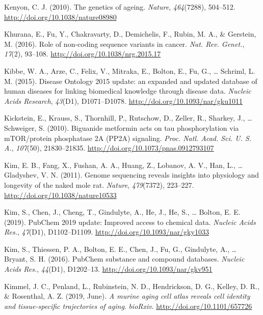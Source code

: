 \documentclass[12pt,twoside]{unicam}
\begin{document}
\begin{cslreferences}
\leavevmode\hypertarget{ref-Kenyon2010}{}%
Kenyon, C. J. (2010). The genetics of ageing. \emph{Nature}, \emph{464}(7288), 504--512. \url{http://doi.org/10.1038/nature08980}

\leavevmode\hypertarget{ref-Khurana2016}{}%
Khurana, E., Fu, Y., Chakravarty, D., Demichelis, F., Rubin, M. A., \& Gerstein, M. (2016). Role of non-coding sequence variants in cancer. \emph{Nat. Rev. Genet.}, \emph{17}(2), 93--108. \url{http://doi.org/10.1038/nrg.2015.17}

\leavevmode\hypertarget{ref-Kibbe2015}{}%
Kibbe, W. A., Arze, C., Felix, V., Mitraka, E., Bolton, E., Fu, G., \ldots{} Schriml, L. M. (2015). Disease Ontology 2015 update: an expanded and updated database of human diseases for linking biomedical knowledge through disease data. \emph{Nucleic Acids Research}, \emph{43}(D1), D1071--D1078. \url{http://doi.org/10.1093/nar/gku1011}

\leavevmode\hypertarget{ref-Kickstein2010}{}%
Kickstein, E., Krauss, S., Thornhill, P., Rutschow, D., Zeller, R., Sharkey, J., \ldots{} Schweiger, S. (2010). Biguanide metformin acts on tau phosphorylation via mTOR/protein phosphatase 2A (PP2A) signaling. \emph{Proc. Natl. Acad. Sci. U. S. A.}, \emph{107}(50), 21830--21835. \url{http://doi.org/10.1073/pnas.0912793107}

\leavevmode\hypertarget{ref-Kim2011}{}%
Kim, E. B., Fang, X., Fushan, A. A., Huang, Z., Lobanov, A. V., Han, L., \ldots{} Gladyshev, V. N. (2011). Genome sequencing reveals insights into physiology and longevity of the naked mole rat. \emph{Nature}, \emph{479}(7372), 223--227. \url{http://doi.org/10.1038/nature10533}

\leavevmode\hypertarget{ref-Kim2019}{}%
Kim, S., Chen, J., Cheng, T., Gindulyte, A., He, J., He, S., \ldots{} Bolton, E. E. (2019). PubChem 2019 update: Improved access to chemical data. \emph{Nucleic Acids Res.}, \emph{47}(D1), D1102--D1109. \url{http://doi.org/10.1093/nar/gky1033}

\leavevmode\hypertarget{ref-Kim2016}{}%
Kim, S., Thiessen, P. A., Bolton, E. E., Chen, J., Fu, G., Gindulyte, A., \ldots{} Bryant, S. H. (2016). PubChem substance and compound databases. \emph{Nucleic Acids Res.}, \emph{44}(D1), D1202--13. \url{http://doi.org/10.1093/nar/gkv951}

\leavevmode\hypertarget{ref-Kimmel2019}{}%
Kimmel, J. C., Penland, L., Rubinstein, N. D., Hendrickson, D. G., Kelley, D. R., \& Rosenthal, A. Z. (2019, June). \emph{A murine aging cell atlas reveals cell identity and tissue-specific trajectories of aging}. \emph{bioRxiv}. \url{http://doi.org/10.1101/657726}


\end{cslreferences}
\end{document}
